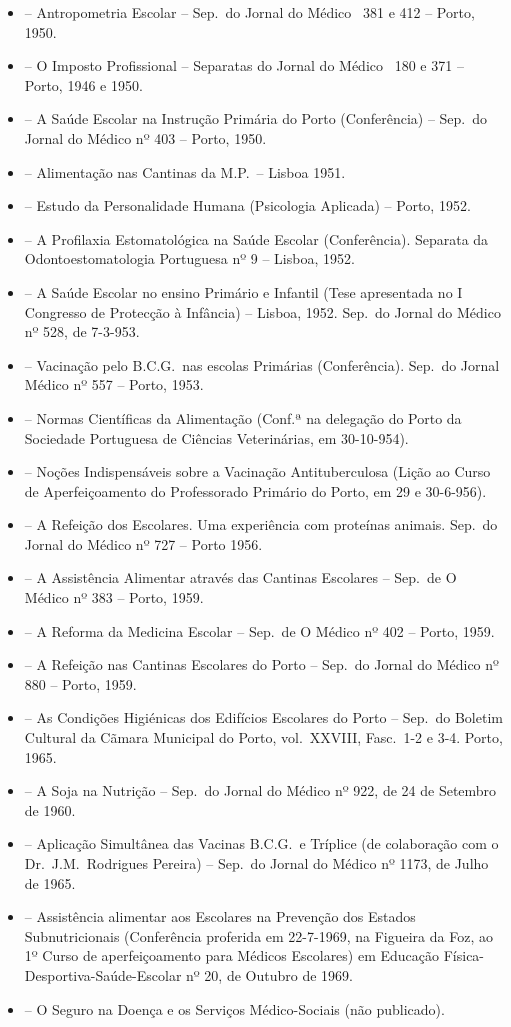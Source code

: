 \documentclass[9pt]{article}
\begin{document}
{\begin{itemize}
\item[18] -- Antropometria Escolar -- Sep.\ do Jornal do Médico \nos\ 381 e 412 -- Porto, 1950.
\item[19] -- O Imposto Profissional --  Separatas do Jornal do Médico \nos\ 180 e 371 -- Porto, 1946 e 1950.
\item[20] -- A Saúde Escolar na Instru\-ção Primária do Porto (Conferência) -- Sep.\ do Jornal do Médico nº 403 -- Porto, 1950.
\item[21] -- Alimenta\-ção nas Cantinas da M.P.\ -- Lisboa 1951.
\item[22] -- Estudo da Personalidade Humana (Psicologia Aplicada) -- Porto, 1952.
\item[23] -- A Profilaxia Estomatológica na Saúde Escolar (Conferên\-cia). Separata da Odontoestomatologia Portuguesa nº 9 -- Lisboa, 1952.
\item[24] -- A Saúde Escolar no ensino Primário e Infantil (Tese apresentada no I Congresso de Protec\-ção à Infância) -- Lisboa, 1952. Sep.\ do Jornal do Médico nº 528, de 7-3-953.
\item[25] -- Vacina\-ção pelo B.C.G.\ nas escolas Primárias (Conferência). Sep.\ do Jornal Médico nº 557 -- Porto, 1953.
\item[26] -- Normas Científi\-cas da Alimenta\-ção (Conf.ª na delega\-ção do Porto da Sociedade Portuguesa de Ciências Veterinárias, em 30-10-954).
\item[27] -- No\-ções Indispensáveis sobre a Vacina\-ção Antituberculosa (Li\-ção ao Curso de Aperfeiçoamento do Professorado Primário do Porto, em 29 e 30-6-956).
\item[28] -- A Refei\-ção dos Escolares. Uma experiência com proteínas animais. Sep.\ do Jornal do Médico nº 727 -- Porto 1956.
\item[29] -- A Assistência Alimentar através das Cantinas Escolares -- Sep.\ de O Médico nº 383 -- Porto, 1959.
\item[30] -- A Reforma da Medicina Escolar -- Sep.\ de O Médico nº 402 -- Porto, 1959.
\item[31] -- A Refei\-ção nas Cantinas Escolares do Porto -- Sep.\ do Jornal do Médico nº 880 -- Porto, 1959.
\item[32] -- As Condi\-ções Higiénicas dos Edifícios Escolares do Porto -- Sep.\ do Boletim Cultural da Cãmara Municipal do Porto, vol.\ XXVIII, Fasc.\ 1-2 e 3-4. Porto, 1965.
\item[33] -- A Soja na Nutri\-ção -- Sep.\ do Jornal do Médico nº 922, de 24 de Setembro de 1960.
\item[34] -- Aplica\-ção Simultânea das Vacinas B.C.G.\ e Tríplice (de colabora\-ção com o Dr.\ J.M.\ Rodrigues Pereira) -- Sep.\ do Jornal do Médico nº 1173, de Ju\-lho de 1965.
\item[35] -- Assistência alimentar aos Escolares na Preven\-ção dos Estados Subnutricionais (Conferência proferida em 22-7-1969, na Figueira da Foz, ao 1º Curso de aperfeiçoamento para Médicos Escolares) em Educa\-ção Física-Desportiva-Saúde-Escolar nº 20, de Outubro de 1969.
\item[36] -- O Seguro na Doença e os Serviços Médico-Sociais (não publicado).
\end{itemize}

}
\end{document}
